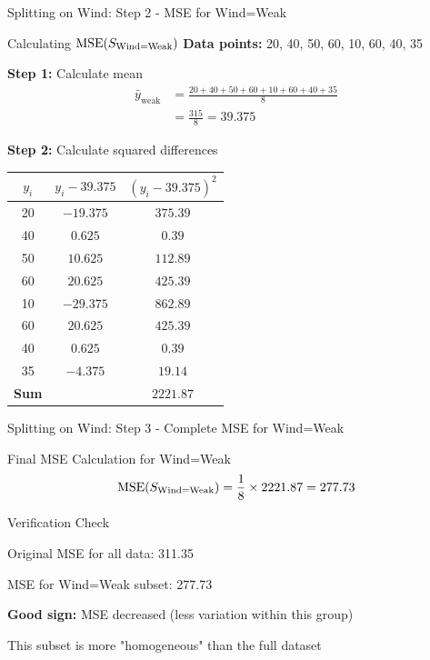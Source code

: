 \documentclass[usenames,dvipsnames]{beamer}
\begin{document}
\begin{frame}{Splitting on Wind: Step 2 - MSE for Wind=Weak}
\small
\begin{examplebox}{Calculating $\operatorname{MSE}(S_{\text{Wind=Weak}})$}
\textbf{Data points:} 20, 40, 50, 60, 10, 60, 40, 35

\pause
\textbf{Step 1:} Calculate mean
\begin{align*}
\bar{y}_{\text{weak}} &= \frac{20 + 40 + 50 + 60 + 10 + 60 + 40 + 35}{8} \\
&= \frac{315}{8} = 39.375    
\end{align*}

\pause
\textbf{Step 2:} Calculate squared differences
\scriptsize
\begin{tabular}{|c|c|c|}
\hline
$y_i$ & $y_i - 39.375$ & $(y_i - 39.375)^2$ \\ \hline
20 & $-19.375$ & $375.39$ \\
40 & $0.625$ & $0.39$ \\
50 & $10.625$ & $112.89$ \\
60 & $20.625$ & $425.39$ \\
10 & $-29.375$ & $862.89$ \\
60 & $20.625$ & $425.39$ \\
40 & $0.625$ & $0.39$ \\
35 & $-4.375$ & $19.14$ \\ \hline
\textbf{Sum} & & $\mathbf{2221.87}$ \\
\hline
\end{tabular}
\end{examplebox}
\end{frame}

\begin{frame}{Splitting on Wind: Step 3 - Complete MSE for Wind=Weak}
\begin{examplebox}{Final MSE Calculation for Wind=Weak}
\[
\operatorname{MSE}(S_{\text{Wind=Weak}}) = \frac{1}{8} \times 2221.87 = 277.73
\]
\end{examplebox}

\pause
\begin{examplebox}{Verification Check}
\cleanitemize
{
    \item Original MSE for all data: 311.35
    \item MSE for Wind=Weak subset: 277.73
    \item \textbf{Good sign:} MSE decreased (less variation within this group)
    \item This subset is more "homogeneous" than the full dataset
}
\end{examplebox}
\end{frame}
\end{document}
